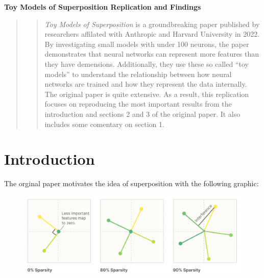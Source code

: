 \documentclass{article} %
\begin{document}


\noindent\makebox[\linewidth]{\rule{\textwidth}{1pt}} 
\vspace*{0mm} %
\begin{center}
    \Large\textbf{Toy Models of Superposition Replication and Findings}
\end{center}
\vspace*{2mm} %
\noindent\makebox[\linewidth]{\rule{\textwidth}{1pt}}
\vspace*{0mm}

\begin{abstract}
\begin{quote}
    \textit{Toy Models of Superposition}\cite{elhage2022toy} is a groundbreaking paper published by 
    researchers affilated with Anthropic and Harvard University in 2022. By 
    investigating small models with under 100 neurons, the paper demonstrates 
    that neural networks can represent more features than they have demensions. 
    Additionally, they use these so called ``toy models'' to understand the 
    relationship between how neural networks are trained and how they represent 
    the data internally. The original paper is quite extensive. As a result, this
    replication focuses on reproducing the most important results from the  
    introduction and sections 2 and 3 of the original paper. It also includes some
    comentary on section 1.
\end{quote}
\end{abstract}
\section{Introduction}
The orginal paper motivates the idea of superposition with the following graphic:

\begin{figure}[h]
    \centering
    \includegraphics[width=0.55\linewidth]{section_1/images/section1_anthropic_graphic_.png}
    \captionsetup{font=footnotesize} %
    \label{fig:section1_anthropic}
\end{figure}
\end{document}
